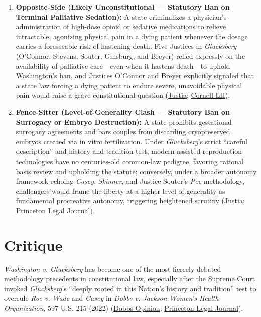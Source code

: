 \documentclass[12pt]{article}
\begin{document}
\begin{enumerate}
\item \textbf{Opposite-Side (Likely Unconstitutional --- Statutory Ban on Terminal Palliative Sedation):} A state criminalizes a physician's administration of high-dose opioid or sedative medications to relieve intractable, agonizing physical pain in a dying patient whenever the dosage carries a foreseeable risk of hastening death. Five Justices in \textit{Glucksberg} (O'Connor, Stevens, Souter, Ginsburg, and Breyer) relied expressly on the availability of palliative care---even when it hastens death---to uphold Washington's ban, and Justices O'Connor and Breyer explicitly signaled that a state law forcing a dying patient to endure severe, unavoidable physical pain would raise a grave constitutional question (\href{https://supreme.justia.com/cases/federal/us/521/702/}{Justia}; \href{https://www.law.cornell.edu/supct/html/96-110.ZC4.html}{Cornell LII}).

\item \textbf{Fence-Sitter (Level-of-Generality Clash --- Statutory Ban on Surrogacy or Embryo Destruction):} A state prohibits gestational surrogacy agreements and bars couples from discarding cryopreserved embryos created via in vitro fertilization. Under \textit{Glucksberg}'s strict ``careful description'' and history-and-tradition test, modern assisted-reproduction technologies have no centuries-old common-law pedigree, favoring rational basis review and upholding the statute; conversely, under a broader autonomy framework echoing \textit{Casey}, \textit{Skinner}, and Justice Souter's \textit{Poe} methodology, challengers would frame the liberty at a higher level of generality as fundamental procreative autonomy, triggering heightened scrutiny (\href{https://supreme.justia.com/cases/federal/us/521/702/}{Justia}; \href{https://legaljournal.princeton.edu/the-right-to-death-how-an-examination-of-washington-v-glucksberg-reveals-the-future-of-fundamental-rights/}{Princeton Legal Journal}).
\end{enumerate}

\section{Critique}

\textit{Washington v. Glucksberg} has become one of the most fiercely debated methodology precedents in constitutional law, especially after the Supreme Court invoked \textit{Glucksberg}'s ``deeply rooted in this Nation's history and tradition'' test to overrule \textit{Roe v. Wade} and \textit{Casey} in \textit{Dobbs v. Jackson Women's Health Organization}, 597 U.S. 215 (2022) (\href{https://www.supremecourt.gov/opinions/21pdf/19-1392_6j37.pdf}{Dobbs Opinion}; \href{https://legaljournal.princeton.edu/the-right-to-death-how-an-examination-of-washington-v-glucksberg-reveals-the-future-of-fundamental-rights/}{Princeton Legal Journal}).
\end{document}
